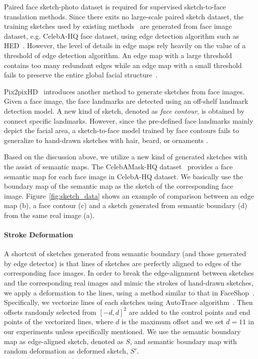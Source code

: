 

Paired face sketch-photo dataset is required for supervised sketch-to-face translation methods.
Since there exits no large-scale paired sketch dataset, the training sketches used by existing methods~\cite{pix2pix, Lines2Face} are generated from face image dataset, e.g. CelebA-HQ face dataset, using edge detection algorithm such as HED~\cite{HED}.
%
However, the level of details in edge maps rely heavily on the value of a threshold of edge detection algorithm. An edge map with a large threshold contains too many redundant edges while an edge map with a small threshold fails to preserve the entire global facial structure~\cite{Lines2Face}.

Pix2pixHD~\cite{pix2pixHD} introduces another method to generate sketches from face images. Given a face image, the face landmarks are detected using an off-shelf landmark detection model. A new kind of sketch, denoted as \textit{face contour}, is obtained by connect specific landmarks. However, since the pre-defined face landmarks mainly depict the facial area,  a sketch-to-face model trained by face contours fails to generalize to hand-drawn sketches with hair, beard, or ornaments . 

Based on the discussion above, we utilize a new kind of generated sketches with the assist of semantic maps.
The CelebAMask-HQ dataset~\cite{CelebAMask-HQ} provides a face semantic map for each face image in CelebA-HQ dataset. We basically use the boundary map of the semantic map as the sketch of the corresponding face image. Figure~\ref{fig:sketch_data} shows an example of comparison between an edge map (b), a face contour (c) and a sketch generated from semantic boundary (d) from the same real image (a).
%


\paragraph{Stroke Deformation}
A shortcut of sketches generated from semantic boundary (and those generated by edge detector) is that lines of sketches are perfectly aligned to edges of the corresponding face images. In order to break the edge-alignment between sketches and the corresponding real images and mimic the strokes of hand-drawn sketches, we apply a deformation to the lines, using a method similar to that in FaceShop~\cite{FaceShop}. Specifically, we vectorize lines of each sketches using AutoTrace algorithm~\cite{AutoTrace}. Then offsets randomly selected from $[-d, d]^2$ are added to the control points and end points of the vectorized lines, where $d$ is the maximum offset and we set $d=11$ in our experiments unless specifically mentioned.
%
We use the semantic boundary map as edge-aligned sketch, denoted as $S$, and semantic boundary map with random deformation as deformed sketch, $S'$.

